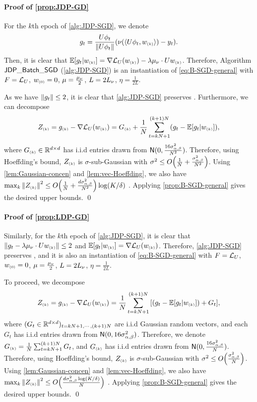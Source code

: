 \paragraph{Proof of \cref{prop:JDP-GD}}
For the $k$th epoch of \cref{alg:JDP-SGD}, we denote
\begin{align*}
    g_t=\frac{U\phi_t}{\|U\phi_t\|}{\left(  \nu(\langle U\phi_t, w_{\scriptscriptstyle{ (k) }} \rangle) -y_t  \right)}.
\end{align*}
Then, it is clear that $\mathbb{E}[g_t|w_{\scriptscriptstyle{ (k) }}]=\nabla \mathcal{L}_{U}(w_{\scriptscriptstyle{ (k) }})-\lambda\mu_\nu\cdot Uw_{\scriptscriptstyle{ (k) }}$. 
Therefore, Algorithm $\mathsf{JDP\_Batch\_SGD}$ (\cref{alg:JDP-SGD}) is an instantiation of \eqref{eq:B-SGD-general} with $F=\mathcal{L}_{U}$, $w_{\scriptscriptstyle{ (0) }}=0$, $\mu=\frac{\mu_\nu}{2}$, $L=2L_\nu$, $\eta=\frac{1}{2L}$. 

As we have $\left\|g_t\right\|\leq 2$, it is clear that \cref{alg:JDP-SGD} preserves \aJDP.
Furthermore, we can decompose
\begin{align*}
    Z_{\scriptscriptstyle{ (k) }}=g_{\scriptscriptstyle{ (k) }}-\nabla \mathcal{L}_{U}(w_{\scriptscriptstyle{ (k) }})=G_{\scriptscriptstyle{ (k) }}+\frac1N \sum_{t=kN+1}^{(k+1)N} (g_t-\mathbb{E}[g_t|w_{\scriptscriptstyle{ (k) }}]),
\end{align*}
where $G_{\scriptscriptstyle{ (k) }}\in\mathbb{R}^{d\times d}$ has i.i.d entries drawn from $\mathsf{N}(0, \frac{16\sigma_{\alpha,\beta}^2}{N^2})$.
Therefore, using Hoeffding's bound, $Z_{\scriptscriptstyle{ (k) }}$ is $\sigma$-sub-Gaussian with $\sigma^2\leq O{\left( \frac{1}{N}+\frac{\sigma_{\alpha,\beta}^2}{N^2} \right)}$. Using \cref{lem:Gaussian-concen} and \cref{lem:vec-Hoeffding}, we also have $\max_{k}\left\|Z_{\scriptscriptstyle{ (k) }}\right\|^2\leq O{\left( \frac{1}{N}+\frac{d\sigma_{\alpha,\beta}^2}{N^2} \right)}\log(K/\delta)$ \whp. Applying \cref{prop:B-SGD-general} gives the desired upper bounds.
\qed


\paragraph{Proof of \cref{prop:LDP-GD}}
Similarly, for the $k$th epoch of \cref{alg:JDP-SGD}, it is clear that $\left\|g_t-\lambda\mu_\nu\cdot Uw_{\scriptscriptstyle{ (k) }}\right\|\leq 2$ and $\mathbb{E}[g_t|w_{\scriptscriptstyle{ (k) }}]=\nabla \mathcal{L}_{U}(w_{\scriptscriptstyle{ (k) }})$. Therefore, \cref{alg:JDP-SGD} preserves \aLDP, and it is also an instantiation of \eqref{eq:B-SGD-general} with $F=\mathcal{L}_{U}$, $w_{\scriptscriptstyle{ (0) }}=0$, $\mu=\frac{\mu_\nu}{2}$, $L=2L_\nu$, $\eta=\frac{1}{2L}$. 

To proceed, we decompose
\begin{align*}
    Z_{\scriptscriptstyle{ (k) }}=g_{\scriptscriptstyle{ (k) }}-\nabla \mathcal{L}_{U}(w_{\scriptscriptstyle{ (k) }})=\frac1N \sum_{t=kN+1}^{(k+1)N} {\left[  (g_t-\mathbb{E}[g_t|w_{\scriptscriptstyle{ (k) }}])+G_t \right]},
\end{align*}
where $(G_t\in\mathbb{R}^{d\times d})_{t=kN+1,\cdots,(k+1)N}$ are i.i.d Gaussian random vectors, and each $G_t$ has i.i.d entries drawn from $\mathsf{N}(0, 16\sigma_{\alpha,\beta}^2)$. Therefore, we denote $G_{\scriptscriptstyle{ (k) }}=\frac1N \sum_{t=kN+1}^{(k+1)N} G_t$, and $G_{\scriptscriptstyle{ (k) }}$ has i.i.d entries drawn from $\mathsf{N}(0, \frac{16\sigma_{\alpha,\beta}^2}{N} )$.
Therefore, using Hoeffding's bound, $Z_{\scriptscriptstyle{ (k) }}$ is $\sigma$-sub-Gaussian with $\sigma^2\leq O{\left( \frac{\sigma_{\alpha,\beta}^2}{N} \right)}$. Using \cref{lem:Gaussian-concen} and \cref{lem:vec-Hoeffding}, we also have $\max_{k}\left\|Z_{\scriptscriptstyle{ (k) }}\right\|^2\leq O{\left( \frac{d\sigma_{\alpha,\beta}^2\log(K/\delta)}{N} \right)}$ \whp. Applying \cref{prop:B-SGD-general} gives the desired upper bounds.
\qed




